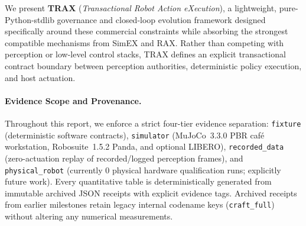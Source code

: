 \documentclass{trax}
\begin{document}
We present \textbf{TRAX} (\emph{Transactional Robot Action eXecution}), a lightweight, pure-Python-stdlib governance and closed-loop evolution framework designed specifically around these commercial constraints while absorbing the strongest compatible mechanisms from SimEX and RAX. Rather than competing with perception or low-level control stacks, TRAX defines an explicit transactional contract boundary between perception authorities, deterministic policy execution, and host actuation.

\paragraph{Evidence Scope and Provenance.} Throughout this report, we enforce a strict four-tier evidence separation: \texttt{fixture} (deterministic software contracts), \texttt{simulator} (MuJoCo~3.3.0 PBR caf\'e workstation, Robosuite~1.5.2 Panda, and optional LIBERO), \texttt{recorded\_data} (zero-actuation replay of recorded/logged perception frames), and \texttt{physical\_robot} (currently $0$ physical hardware qualification runs; explicitly future work). Every quantitative table is deterministically generated from immutable archived JSON receipts with explicit evidence tags. Archived receipts from earlier milestones retain legacy internal codename keys (\texttt{craft\_full}) without altering any numerical measurements.
\end{document}
